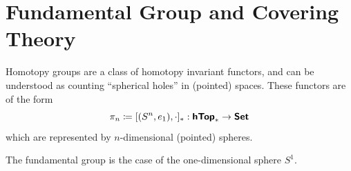 \section{Fundamental Group and Covering Theory}

Homotopy groups are a class of homotopy invariant functors, and can be understood as counting ``spherical holes'' in (pointed) spaces. These functors are of the form \[
\pi_n \coloneq [(S^n,e_1),\cdot]_* : \bm{\mathsf{hTop}}_* \to \bm{\mathsf{Set}}
\]
which are represented by $n$-dimensional (pointed) spheres.

The fundamental group is the case of the one-dimensional sphere $S^1$.




